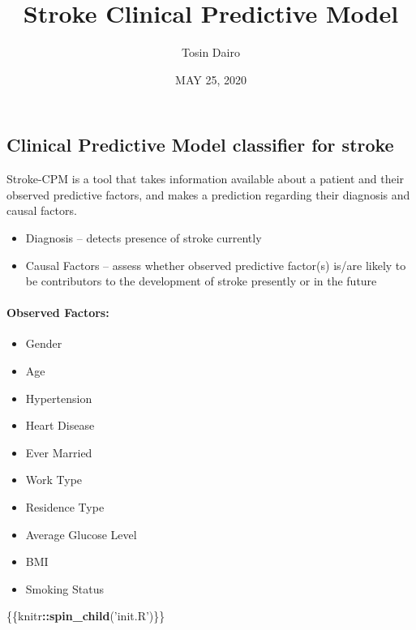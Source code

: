 \documentclass[]{article}
\title{Stroke Clinical Predictive Model}
\author{Tosin Dairo}
\date{MAY 25, 2020}
\newenvironment{Shaded}{\begin{snugshade}}{\end{snugshade}}
\newcommand{\KeywordTok}[1]{\textcolor[rgb]{0.13,0.29,0.53}{\textbf{#1}}}
\newcommand{\NormalTok}[1]{#1}
\newcommand{\OperatorTok}[1]{\textcolor[rgb]{0.81,0.36,0.00}{\textbf{#1}}}
\newcommand{\StringTok}[1]{\textcolor[rgb]{0.31,0.60,0.02}{#1}}
\providecommand{\tightlist}{%
  \setlength{\itemsep}{0pt}\setlength{\parskip}{0pt}}
\let\oldparagraph\paragraph
\renewcommand{\paragraph}[1]{\oldparagraph{#1}\mbox{}}
\begin{document}
\maketitle

\hypertarget{clinical-predictive-model-classifier-for-stroke}{%
\subsection{Clinical Predictive Model classifier for
stroke}\label{clinical-predictive-model-classifier-for-stroke}}

Stroke-CPM is a tool that takes information available about a patient
and their observed predictive factors, and makes a prediction regarding
their diagnosis and causal factors.

\begin{itemize}
\tightlist
\item
  Diagnosis -- detects presence of stroke currently
\item
  Causal Factors -- assess whether observed predictive factor(s) is/are
  likely to be contributors to the development of stroke presently or in
  the future
\end{itemize}

\hypertarget{observed-factors}{%
\paragraph{Observed Factors:}\label{observed-factors}}

\begin{itemize}
\tightlist
\item
  Gender
\item
  Age
\item
  Hypertension
\item
  Heart Disease
\item
  Ever Married
\item
  Work Type
\item
  Residence Type
\item
  Average Glucose Level
\item
  BMI
\item
  Smoking Status
\end{itemize}

\begin{Shaded}
\begin{Highlighting}[]
\NormalTok{\{\{knitr}\OperatorTok{::}\KeywordTok{spin_child}\NormalTok{(}\StringTok{'init.R'}\NormalTok{)\}\}}
\end{Highlighting}
\end{Shaded}
\end{document}
